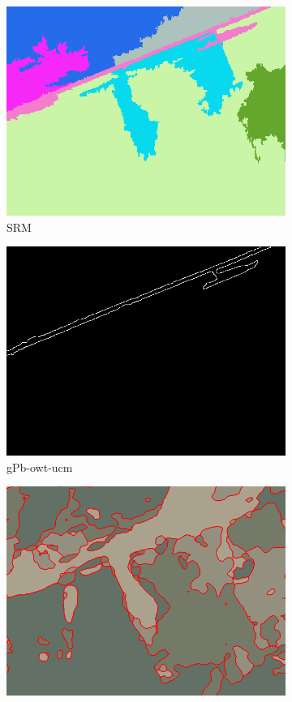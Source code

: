 \begin{figure}[htb]
\begin{minipage}[r]{\linewidth}
\begin{subfigure}{.32\linewidth}
			\includegraphics[width=\linewidth]{imgs/seg_srm}
			\caption{SRM}
		\end{subfigure}
		\begin{subfigure}{.32\linewidth}
			\includegraphics[width=\linewidth]{imgs/seg_gpb}
			\caption{gPb-owt-ucm}
		\end{subfigure}
		\begin{subfigure}{.32\linewidth}
			\includegraphics[width=\linewidth]{imgs/seg_fseg}

\end{subfigure}
\end{minipage}
\end{figure}
